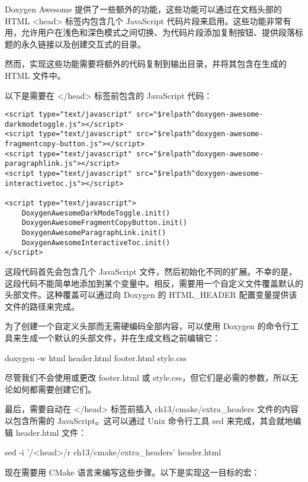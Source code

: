 Doxygen Awesome 提供了一些额外的功能，这些功能可以通过在文档头部的 HTML <head> 标签内包含几个 JavaScript 代码片段来启用。这些功能非常有用，允许用户在浅色和深色模式之间切换、为代码片段添加复制按钮、提供段落标题的永久链接以及创建交互式的目录。

然而，实现这些功能需要将额外的代码复制到输出目录，并将其包含在生成的 HTML 文件中。

以下是需要在 </head> 标签前包含的 JavaScript 代码：


\begin{verbatim}
<script type="text/javascript" src="$relpath^doxygen-awesome-darkmodetoggle.js"></script>
<script type="text/javascript" src="$relpath^doxygen-awesome-fragmentcopy-button.js"></script>
<script type="text/javascript" src="$relpath^doxygen-awesome-paragraphlink.js"></script>
<script type="text/javascript" src="$relpath^doxygen-awesome-interactivetoc.js"></script>

<script type="text/javascript">
    DoxygenAwesomeDarkModeToggle.init()
    DoxygenAwesomeFragmentCopyButton.init()
    DoxygenAwesomeParagraphLink.init()
    DoxygenAwesomeInteractiveToc.init()
</script>
\end{verbatim}

这段代码首先会包含几个 JavaScript 文件，然后初始化不同的扩展。不幸的是，这段代码不能简单地添加到某个变量中。相反，需要用一个自定义文件覆盖默认的头部文件。这种覆盖可以通过向 Doxygen 的 HTML\_HEADER 配置变量提供该文件的路径来完成。

为了创建一个自定义头部而无需硬编码全部内容，可以使用 Doxygen 的命令行工具来生成一个默认的头部文件，并在生成文档之前编辑它：

\begin{shell}
doxygen -w html header.html footer.html style.css
\end{shell}

尽管我们不会使用或更改 footer.html 或 style.css，但它们是必需的参数，所以无论如何都需要创建它们。

最后，需要自动在 </head> 标签前插入 ch13/cmake/extra\_headers 文件的内容以包含所需的 JavaScript。这可以通过 Unix 命令行工具 sed 来完成，其会就地编辑 header.html 文件：

\begin{shell}
sed -i '/<\/head>/r ch13/cmake/extra_headers' header.html
\end{shell}

现在需要用 CMake 语言来编写这些步骤。以下是实现这一目标的宏：


